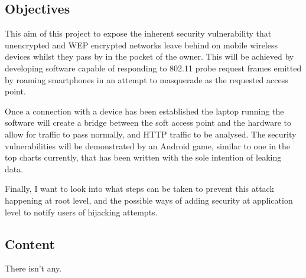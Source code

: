 \subsection{Objectives}
This aim of this project to expose the inherent security vulnerability that unencrypted and WEP encrypted networks leave behind on mobile wireless devices whilst they pass by in the pocket of the owner. This will be achieved by developing software capable of responding to 802.11 probe request frames emitted by roaming smartphones in an attempt to masquerade as the requested access point.

Once a connection with a device has been established the laptop running the software will create a bridge between the soft access point and the hardware to allow for traffic to pass normally, and HTTP traffic to be analysed. The security vulnerabilities will be demonstrated by an Android game, similar to one in the top charts currently, that has been written with the sole intention of leaking data. 

Finally, I want to look into what steps can be taken to prevent this attack happening at root level, and the possible ways of adding security at application level to notify users of hijacking attempts.

\subsection{Content}
There isn't any.
\clearpage